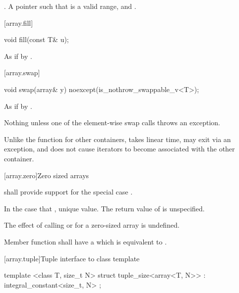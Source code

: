 \begin{itemdescr}
\pnum \returns {}.
A pointer such that  is a valid range, and
.
\end{itemdescr}

[array.fill]{}

%
%
\begin{itemdecl}
void fill(const T& u);
\end{itemdecl}

\begin{itemdescr}
\pnum
\effects As if by .
\end{itemdescr}

[array.swap]{}

%
%
\begin{itemdecl}
void swap(array& y) noexcept(is_nothrow_swappable_v<T>);
\end{itemdecl}

\begin{itemdescr}
\pnum
\effects As if by .

\pnum
\throws Nothing unless one of the element-wise swap calls throws an exception.

\pnum
\realnote Unlike the  function for other containers, 
takes linear time, may exit via an exception, and does not cause iterators to
become associated with the other container.
\end{itemdescr}

[array.zero]{Zero sized arrays}

%
\pnum{} shall provide support for the special case .

\pnum In the case that ,  unique value.
The return value of  is unspecified.

\pnum
The effect of calling  or  for a zero-sized array is
undefined.

\pnum
Member function  shall have a 
which is equivalent to .

[array.tuple]{Tuple interface to class template }
%
%
%
%
\begin{itemdecl}
template <class T, size_t N>
  struct tuple_size<array<T, N>> : integral_constant<size_t, N> { };
\end{itemdecl}

